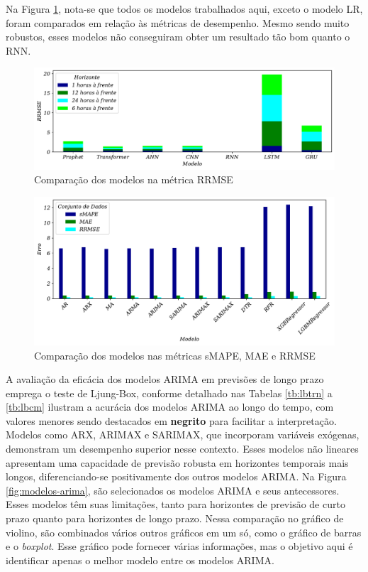 Na Figura \ref{fig:rrmse_comparar}, nota-se que todos os modelos trabalhados aqui, exceto o modelo LR, foram comparados em relação às métricas de desempenho. Mesmo sendo muito robustos, esses modelos não conseguiram obter um resultado tão bom quanto o RNN.
\begin{figure}[!htb]
	\centering
	\caption{Comparação dos modelos na métrica RRMSE\label{fig:rrmse_comparar}}
	\includegraphics[width=\linewidth]{Resultados/Figuras/rrmse_comparar}
\end{figure}

\begin{figure}[!htb]
	\centering
	\caption{Comparação dos modelos nas métricas sMAPE, MAE e RRMSE\label{fig:basic_comparar}}
	\includegraphics[width=\linewidth]{Resultados/Figuras/basic_comparar}
\end{figure}



A avaliação da eficácia dos modelos ARIMA em previsões de longo prazo emprega o teste de Ljung-Box, conforme detalhado nas Tabelas \ref{tb:lbtrn} a \ref{tb:lbcm} ilustram a acurácia dos modelos ARIMA ao longo do tempo, com valores menores sendo destacados em \textbf{negrito}  para facilitar a interpretação. Modelos como ARX, ARIMAX e SARIMAX, que incorporam variáveis exógenas, demonstram um desempenho superior nesse contexto. Esses modelos não lineares apresentam uma capacidade de previsão robusta em horizontes temporais mais longos, diferenciando-se positivamente dos outros modelos ARIMA. Na Figura \ref{fig:modelos-arima}, são selecionados os modelos ARIMA e seus antecessores. Esses modelos têm suas limitações, tanto para horizontes de previsão de curto prazo quanto para horizontes de longo prazo. Nessa comparação no gráfico de violino, são combinados vários outros gráficos em um só, como o gráfico de barras e o \textit{boxplot}. Esse gráfico pode fornecer várias informações, mas o objetivo aqui é identificar apenas o melhor modelo entre os modelos ARIMA.

